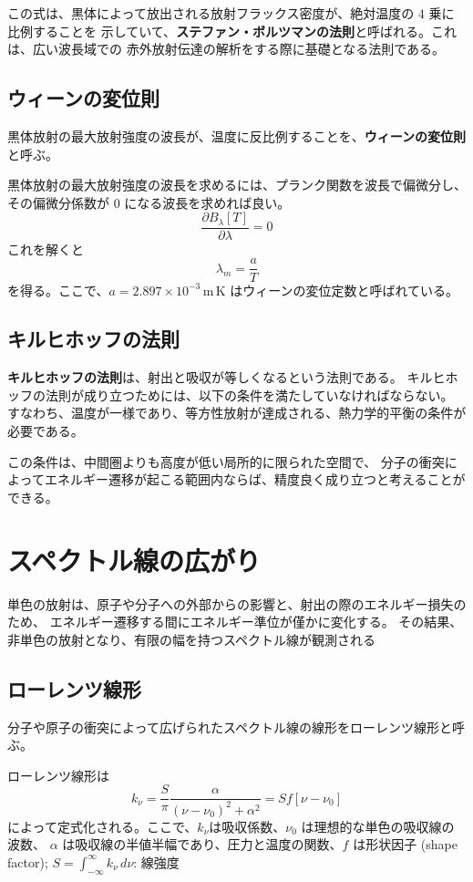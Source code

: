 \documentclass[article]{dennou777}
\newcommand{\Unit}[1]{\,\mathrm{#1}}
\newcommand{\hmemph}[1]{\textbf{#1}}
\begin{document}
この式は、黒体によって放出される放射フラックス密度が、絶対温度の $4$ 乗に比例することを
示していて、\hmemph{ステファン・ボルツマンの法則}と呼ばれる。これは、広い波長域での
赤外放射伝達の解析をする際に基礎となる法則である。

\subsection{ウィーンの変位則}
黒体放射の最大放射強度の波長が、温度に反比例することを、\hmemph{ウィーンの変位則}と呼ぶ。

黒体放射の最大放射強度の波長を求めるには、プランク関数を波長で偏微分し、その偏微分係数が
$0$ になる波長を求めれば良い。
\begin{equation}
	\frac{\partial B_\lambda[T]}{\partial\lambda}=0
\end{equation}
これを解くと
\begin{equation}
	\lambda_m=\frac{a}{T}
\end{equation}
を得る。ここで、$a=2.897\times10^{-3}\Unit{m\,K}$ はウィーンの変位定数と呼ばれている。

\subsection{キルヒホッフの法則}
\hmemph{キルヒホッフの法則}は、射出と吸収が等しくなるという法則である。
キルヒホッフの法則が成り立つためには、以下の条件を満たしていなければならない。
すなわち、温度が一様であり、等方性放射が達成される、熱力学的平衡の条件が必要である。

この条件は、中間圏よりも高度が低い局所的に限られた空間で、
分子の衝突によってエネルギー遷移が起こる範囲内ならば、精度良く成り立つと考えることができる。

\section{スペクトル線の広がり}
単色の放射は、原子や分子への外部からの影響と、射出の際のエネルギー損失のため、
エネルギー遷移する間にエネルギー準位が僅かに変化する。
その結果、非単色の放射となり、有限の幅を持つスペクトル線が観測される

\subsection{ローレンツ線形}
分子や原子の衝突によって広げられたスペクトル線の線形をローレンツ線形と呼ぶ。

ローレンツ線形は
\begin{equation}
	k_\nu=\frac{S}{\pi}\frac{\alpha}{(\nu-\nu_0)^2+\alpha^2}=Sf[\nu-\nu_0]
\end{equation}
によって定式化される。ここで、$k_\nu$は吸収係数、$\nu_0$ は理想的な単色の吸収線の波数、
$\alpha$ は吸収線の半値半幅であり、圧力と温度の関数、$f$ は形状因子 (shape factor);\quad
$\displaystyle S=\int^\infty_{-\infty}k_\nu\,d\nu$: 線強度
\end{document}
